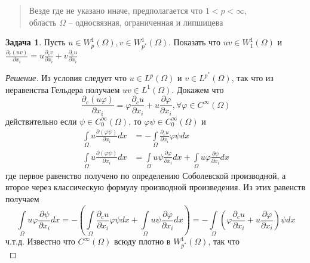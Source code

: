 \documentclass[12pt,a4paper]{article}
\theoremstyle{definition}
\newtheorem{exercise}{Задача}
\newenvironment{solution}
{\renewcommand\qedsymbol{$\blacksquare$}\begin{proof}[Решение]}
{\end{proof}}
\begin{document}
\begin{abstract}
	Везде где не указано иначе, предполагается что $1 < p < \infty$, \\ область $\Omega$ -- односвязная, ограниченная и липшицева
\end{abstract}
\addtocounter{exercise}{6}

\begin{exercise}
	Пусть $u \in W_p^1 (\Omega), v \in W_{p^*}^1 (\Omega)$. Показать что $uv \in W_1^1 (\Omega)$ и \\ $\frac{\partial_c (uv)}{\partial x_i} = u\frac{\partial_c v}{\partial x_i} + v\frac{\partial_c u}{\partial x_i}$
\end{exercise}
\begin{solution}
	Из условия следует что $u \in L^p (\Omega)$ и $v \in L^{p^*} (\Omega)$, так что из неравенства Гельдера получаем $uv \in L^1 (\Omega)$. Докажем что 
	\begin{equation}\label{eq:1}
		\frac{\partial_c (u\varphi)}{\partial x_i} = \varphi \frac{\partial_c u}{\partial x_i} + u \frac{\partial \varphi}{\partial x_i}, \forall \varphi \in C^\infty (\Omega)
	\end{equation}
	действительно если $\psi \in C_0^\infty (\Omega)$, то $\varphi \psi \in C_0^\infty (\Omega)$ и 
	\begin{align*}
		\int\limits_{\Omega}{u \frac{\partial (\varphi \psi)}{\partial x_i} dx} &= -\int\limits_{\Omega}{\frac{\partial_c u}{\partial x_i} \varphi \psi dx} \\
		\int\limits_{\Omega}{u \frac{\partial (\varphi \psi)}{\partial x_i} dx} &= \int\limits_{\Omega}{u \psi \frac{\partial \varphi }{\partial x_i} dx} + \int\limits_{\Omega}{u \varphi \frac{\partial \psi}{\partial x_i} dx}
	\end{align*}
	где первое равенство получено по определению Соболевской производной, а второе через классическую формулу производной произведения. Из этих равенств получаем
	\begin{equation*}
		\int\limits_{\Omega}{u \varphi \frac{\partial \psi}{\partial x_i} dx} = - \left( \int\limits_{\Omega}{\frac{\partial_c u}{\partial x_i} \varphi \psi dx} + \int\limits_{\Omega}{u \psi \frac{\partial \varphi }{\partial x_i} dx} \right) = -\int\limits_{\Omega}{\left( \varphi \frac{\partial_c u}{\partial x_i} + u \frac{\partial \varphi}{\partial x_i} \right) \psi dx}
	\end{equation*} 
	ч.т.д.
	Известно что $C^\infty (\Omega)$ всюду плотно в $W_{p^*}^1 (\Omega)$, так что 
	\begin{equation*}

\end{equation*}
\end{solution}
\end{document}
